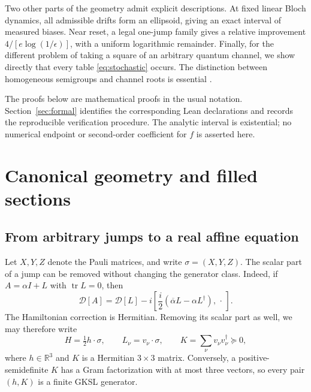 \documentclass[11pt]{article}
\theoremstyle{definition}
\theoremstyle{remark}
\DeclareMathOperator{\tr}{tr}
\newcommand{\Diss}{\mathcal D}
\newcommand{\R}{\mathbb R}
\newcommand{\PSD}{\succeq0}
\begin{document}
Two other parts of the geometry admit explicit descriptions. At fixed linear Bloch dynamics, all admissible drifts form an ellipsoid, giving an exact interval of measured biases. Near reset, a legal one-jump family gives a relative improvement \(4/[e\log(1/\epsilon)]\), with a uniform logarithmic remainder. Finally, for the different problem of taking a square of an arbitrary quantum channel, we show directly that every table \eqref{eq:stochastic} occurs. The distinction between homogeneous semigroups and channel roots is essential \cite{WolfCirac2008}.

The proofs below are mathematical proofs in the usual notation. Section~\ref{sec:formal} identifies the corresponding Lean declarations and records the reproducible verification procedure. The analytic interval is existential; no numerical endpoint or second-order coefficient for \(f\) is asserted here.

\section{Canonical geometry and filled sections}\label{sec:geometry}

\subsection{From arbitrary jumps to a real affine equation}
Let \(X,Y,Z\) denote the Pauli matrices, and write \(\sigma=(X,Y,Z)\). The scalar part of a jump can be removed without changing the generator class. Indeed, if \(A=\alpha I+L\) with \(\tr L=0\), then
\begin{equation}\label{eq:scalar-gauge}
 \Diss[A]=\Diss[L]-i\left[\frac{i}{2}(\overline\alpha L-\alpha L^\dagger),\,\cdot\,\right].
\end{equation}
The Hamiltonian correction is Hermitian. Removing its scalar part as well, we may therefore write
\begin{equation}\label{eq:canonical}
 H=\tfrac12 h\cdot\sigma,\qquad L_\nu=v_\nu\cdot\sigma,
 \qquad K=\sum_\nu v_\nu v_\nu^\dagger\PSD,
\end{equation}
where \(h\in\R^3\) and \(K\) is a Hermitian \(3\times3\) matrix. Conversely, a positive-semidefinite \(K\) has a Gram factorization with at most three vectors, so every pair \((h,K)\) is a finite GKSL generator.
\end{document}
